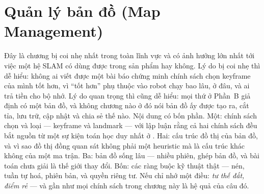 \documentclass[../../vslam.tex]{subfiles}
\begin{document}
\chapter{Quản lý bản đồ (Map Management)}

\begin{tomtat}
Đây là chương bị coi nhẹ nhất trong toàn lĩnh vực và có ảnh hưởng lớn nhất tới việc một hệ SLAM có dùng được trong sản phẩm hay không. Lý do bị coi nhẹ thì dễ hiểu: không ai viết được một bài báo chứng minh chính sách chọn keyframe của mình tốt hơn, vì ``tốt hơn'' phụ thuộc vào robot chạy bao lâu, ở đâu, và ai trả tiền cho bộ nhớ. Lý do quan trọng thì cũng dễ hiểu: mọi thứ ở Phần~B giả định có một bản đồ, và không chương nào ở đó nói bản đồ ấy được tạo ra, cắt tỉa, lưu trữ, cập nhật và chia sẻ thế nào. Nội dung có bốn phần. Một: chính sách chọn và loại --- keyframe và landmark --- với lập luận rằng cả hai chính sách đều bắt nguồn từ một sự kiện toán học duy nhất ở . Hai: cấu trúc đồ thị của bản đồ, và vì sao đồ thị đồng quan sát không phải một heuristic mà là cấu trúc khác không của một ma trận. Ba: bản đồ sống lâu --- nhiều phiên, ghép bản đồ, và bài toán chưa giải là thế giới thay đổi. Bốn: các ràng buộc kỹ thuật thật --- nén, tuần tự hoá, phiên bản, và quyền riêng tư. Nếu chỉ nhớ một điều: \emph{tư thế đắt, điểm rẻ} --- và gần như mọi chính sách trong chương này là hệ quả của câu đó.
\end{tomtat}
\end{document}

